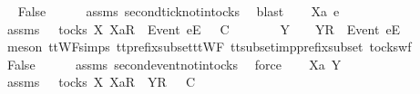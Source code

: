 \begin{isabellebody}
\ \isamarkupfalse%
\ False\isanewline
\ \ \ \ \isamarkupfalse%
\ assms{\isacharparenleft}{}{\isacharparenright}\ second{\isacharunderscore}tick{\isacharunderscore}notin{\isacharunderscore}tocks\ \isamarkupfalse%
\ blast\isanewline
{}\isamarkupfalse%
\isanewline
\ \ \isamarkupfalse%
\ Xa\ e\ {\isasymrho}\ {\isasymsigma}\isanewline
\ \ \isamarkupfalse%
\ assms{\isacharcolon}\ {\isachardoublequoteopen}{\isasymsigma}\ {\isasymin}\ tocks\ X{\isachardoublequoteclose}\ {\isachardoublequoteopen}{\isacharbrackleft}Xa{\isacharbrackright}\isactrlsub R\ {\isacharhash}\ {\isacharbrackleft}Event\ e{\isacharbrackright}\isactrlsub E\ {\isacharhash}\ {\isasymrho}\ {\isasymsubseteq}\isactrlsub C\ {\isasymsigma}{\isachardoublequoteclose}\isanewline
\ \ \isamarkupfalse%
\ \isamarkupfalse%
\ {\isasymsigma}{\isacharprime}\ Y\ \ {\isachardoublequoteopen}{\isasymsigma}\ {\isacharequal}\ {\isacharbrackleft}Y{\isacharbrackright}\isactrlsub R\ {\isacharhash}\ {\isacharbrackleft}Event\ e{\isacharbrackright}\isactrlsub E\ {\isacharhash}\ {\isasymsigma}{\isacharprime}{\isachardoublequoteclose}\isanewline
\ \ \ \ \isamarkupfalse%
\ {\isacharparenleft}meson\ ttWF{\isachardot}simps{\isacharparenleft}{}{}{\isacharparenright}\ tt{\isacharunderscore}prefix{\isacharunderscore}subset{\isacharunderscore}ttWF\ tt{\isacharunderscore}subset{\isacharunderscore}imp{\isacharunderscore}prefix{\isacharunderscore}subset\ tocks{\isacharunderscore}wf{\isacharparenright}\isanewline
\ \ \isamarkupfalse%
\ \isamarkupfalse%
\ False\isanewline
\ \ \ \ \isamarkupfalse%
\ assms{\isacharparenleft}{}{\isacharparenright}\ second{\isacharunderscore}event{\isacharunderscore}notin{\isacharunderscore}tocks\ \isamarkupfalse%
\ force\isanewline
{}\isamarkupfalse%
\isanewline
\ \ \isamarkupfalse%
\ Xa\ Y\ {\isasymrho}\ {\isasymsigma}\isanewline
\ \ \isamarkupfalse%
\ assms{\isacharcolon}\ {\isachardoublequoteopen}{\isasymsigma}\ {\isasymin}\ tocks\ X{\isachardoublequoteclose}\ {\isachardoublequoteopen}{\isacharbrackleft}Xa{\isacharbrackright}\isactrlsub R\ {\isacharhash}\ {\isacharbrackleft}Y{\isacharbrackright}\isactrlsub R\ {\isacharhash}\ {\isasymrho}\ {\isasymsubseteq}\isactrlsub C\ {\isasymsigma}{\isachardoublequoteclose}\isanewline
\ \ \isamarkupfalse%
\ \isamarkupfalse%

\end{isabellebody}
